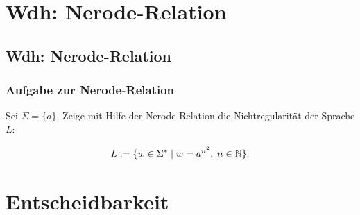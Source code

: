 \newcommand{\thetm}{\begin{tikzpicture}[node distance=2.5cm,auto]
  \node(q0)[state,initial]{$q_0$};
  \node(q1)[state,right of=q0]{$q_1$};
  \node(q2)[state,right of=q1]{$q_2$};
  \node(q3)[state,right of=q2]{$q_3$};
  \node(q4)[state,above of=q3]{$q_4$};
  \node(q5)[state,accepting,below of=q0]{$q_4$};
  \path[->]       (q0) edge node{$a|\sqcup,R$} (q1)
	          (q0) edge node{$\sqcup|\sqcup,N$} (q5)
	          (q1) edge[loop above] node{$a|a,R$} ()
	          (q1) edge node{$b|b,R$} (q2)
	          (q1) edge node{$\sqcup|\sqcup,N$} (q5)
	          (q2) edge[loop below] node{$b|b,R$} ()
	          (q2) edge node{$\sqcup|\sqcup,L$} (q3)
	          (q3) edge node{$b|\sqcup,L$} (q4)
	          (q4) edge[loop above] node{$a|a,L; b|b,L$} ()
	          (q4) edge[bend right] node{$\sqcup|\sqcup,R$} (q0);
 \end{tikzpicture}}



\section{Wdh: Nerode-Relation}
\subsection{Wdh: Nerode-Relation}
\begin{frame}
	\frametitle{Aufgabe zur Nerode-Relation}
	
	Sei $\Sigma = \{a\}$.
Zeige mit Hilfe der Nerode-Relation die Nichtregularit\"at der Sprache $L$: 

\[L := \{w \in \Sigma^*\mid w = a^{n^2},\; n \in \mathbb{N}\}.\]
\end{frame}

\section{Entscheidbarkeit}
